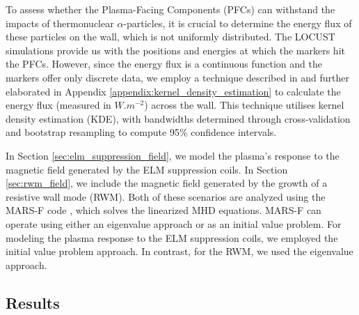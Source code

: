 \documentclass[10pt, a4paper, twoside]{article}
\begin{document}
To assess whether the Plasma-Facing Components (PFCs) can withstand the impacts of thermonuclear $\alpha$-particles, it is crucial to determine the energy flux of these particles on the wall, which is not uniformly distributed. The LOCUST simulations provide us with the positions and energies at which the markers hit the PFCs. However, since the energy flux is a continuous function and the markers offer only discrete data, we employ a technique described in \cite{chen2017} and further elaborated in Appendix \ref{appendix:kernel_density_estimation} to calculate the energy flux (measured in $\si{W.m^{-2}}$) across the wall. This technique utilises kernel density estimation (KDE), with bandwidths determined through cross-validation and bootstrap resampling to compute 95\% confidence intervals.

In Section \ref{sec:elm_suppression_field}, we model the plasma's response to the magnetic field generated by the ELM suppression coils. In Section \ref{sec:rwm_field}, we include the magnetic field generated by the growth of a resistive wall mode (RWM). Both of these scenarios are analyzed using the MARS-F code \cite{liu2015}, which solves the linearized MHD equations. MARS-F can operate using either an eigenvalue approach or as an initial value problem. For modeling the plasma response to the ELM suppression coils, we employed the initial value problem approach. In contrast, for the RWM, we used the eigenvalue approach.


\subsection{Results}
\end{document}
